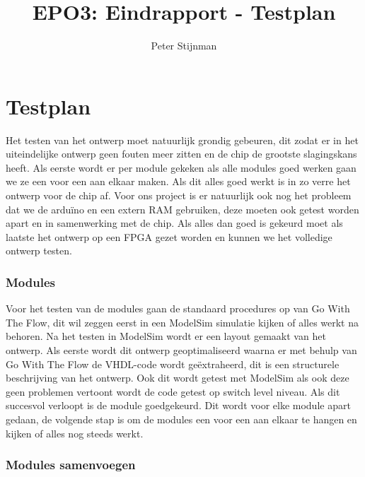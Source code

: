 \documentclass{scrartcl} %
\author{Peter Stijnman}
\title{EPO3: Eindrapport - Testplan}
\begin{document}
\chapter{Testplan}
\label{ch:testplan}


Het testen van het ontwerp moet natuurlijk grondig gebeuren, dit zodat er in het uiteindelijke ontwerp geen fouten meer zitten en de chip de grootste slagingskans heeft. 
Als eerste wordt er per module gekeken als alle modules goed werken gaan we ze een voor een aan elkaar maken. Als dit alles goed werkt is in zo verre het ontwerp voor de chip af.
Voor ons project is er natuurlijk ook nog het probleem dat we de arduïno en een extern RAM gebruiken, deze moeten ook getest worden apart en in samenwerking met de chip.
Als alles dan goed is gekeurd moet als laatste het ontwerp op een FPGA gezet worden en kunnen we het volledige ontwerp testen.

\subsection{Modules}

Voor het testen van de modules gaan de standaard procedures op van Go With The Flow, dit wil zeggen eerst in een ModelSim simulatie kijken of alles werkt na behoren. 
Na het testen in ModelSim wordt er een layout gemaakt van het ontwerp. Als eerste wordt dit ontwerp geoptimaliseerd waarna er met behulp van Go With The Flow de VHDL-code wordt geëxtraheerd,
dit is een structurele beschrijving van het ontwerp. Ook dit wordt getest met ModelSim als ook deze geen problemen vertoont wordt de code getest op switch level niveau. Als dit succesvol verloopt is de module goedgekeurd.
Dit wordt voor elke module apart gedaan, de volgende stap is om de modules een voor een aan elkaar te hangen en kijken of alles nog steeds werkt.



\subsection{Modules samenvoegen}
\end{document}

